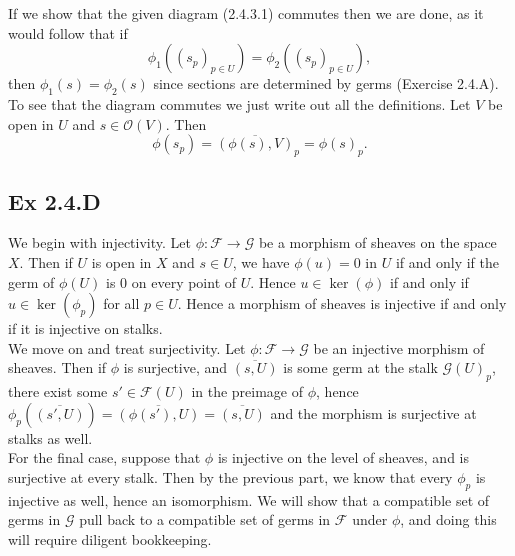\documentclass{article}
\theoremstyle{definition}
\begin{document}
If we show that the given diagram (2.4.3.1) commutes then we are done, as it
would follow that if
\[
	\phi_1((s_p)_{p \in U})
	=
	\phi_2((s_p)_{p \in U}),
\]
then $\phi_1(s) = \phi_2(s)$ since sections are determined by germs (Exercise
2.4.A). \\

To see that the diagram commutes we just write out all the definitions. Let $V$
be open in $U$ and $s \in \mathcal{O}(V)$. Then
\[
	\phi(s_p)
	=
	\overline{(\phi(s), V)}_p
	=
	\phi(s)_p.
\]

\subsection*{Ex 2.4.D}

We begin with injectivity. Let $\phi : \mathcal{F} \to \mathcal{G}$ be a
morphism of sheaves on the space $X$. Then if $U$ is open in $X$ and $s \in U$,
we have $\phi(u) = 0$ in $U$ if and only if the germ of $\phi(U)$ is $0$ on
every point of $U$. Hence $u \in \ker(\phi)$ if and only if $u \in
	\ker(\phi_p)$ for all $p \in U$. Hence a morphism of sheaves is injective if
and only if it is injective on stalks. \\

We move on and treat surjectivity. Let $\phi : \mathcal{F} \to \mathcal{G}$ be
an injective morphism of sheaves. Then if $\phi$ is surjective, and
$\overline{(s, U)}$ is some germ at the stalk $\mathcal{G}(U)_{p}$, there exist
some $s' \in \mathcal{F}(U)$ in the preimage of $\phi$, hence
$\phi_p(\overline{(s', U)}) = \overline{(\phi(s'), U)} = \overline{(s, U)}$ and
the morphism is surjective at stalks as well. \\

For the final case, suppose that $\phi$ is injective on the level of sheaves,
and is surjective at every stalk. Then by the previous part, we know that every
$\phi_p$ is injective as well, hence an isomorphism. We will show that a
compatible set of germs in $\mathcal{G}$ pull back to a compatible set of germs
in $\mathcal{F}$ under $\phi$, and doing this will require diligent
bookkeeping. \\
\end{document}

